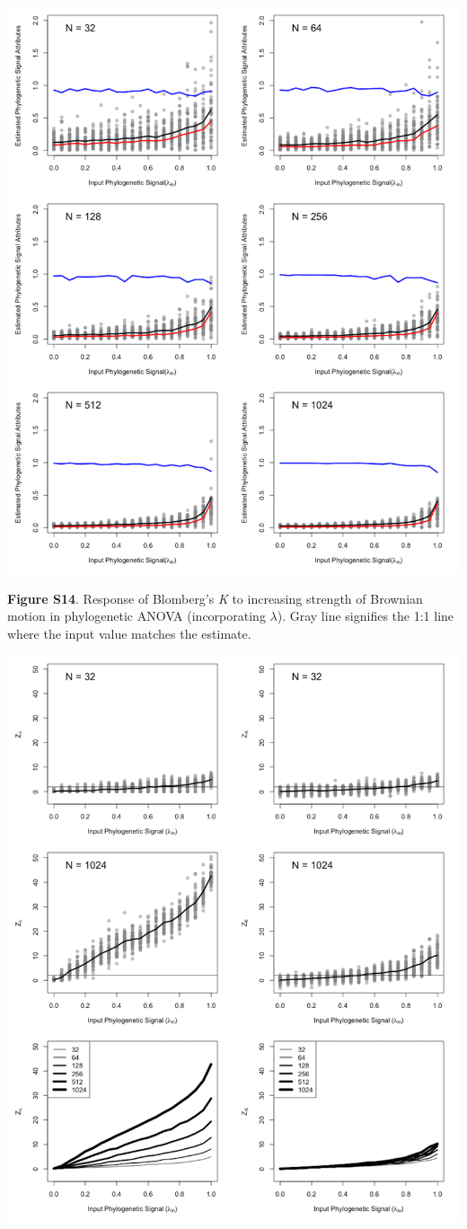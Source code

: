 \documentclass[
]{article}
\begin{document}
\includegraphics[width=0.95\linewidth]{fig.S14}

\textbf{Figure S14}. Response of Blomberg's \textit{K} to increasing
strength of Brownian motion in phylogenetic ANOVA (incorporating
\(\lambda\)). Gray line signifies the 1:1 line where the input value
matches the estimate.

\includegraphics[width=0.95\linewidth]{fig.S15}
\end{document}
